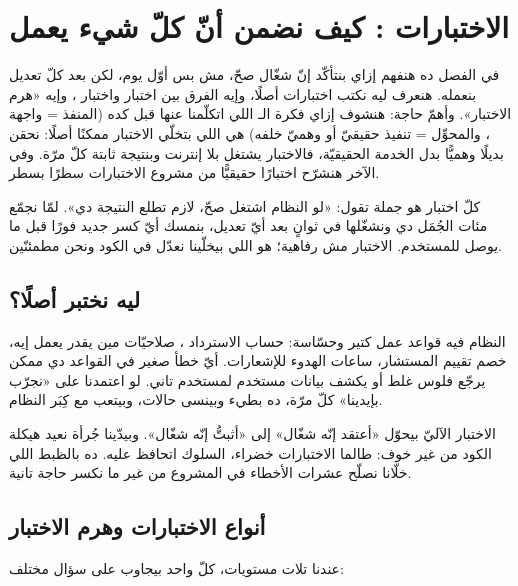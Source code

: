 \section{الاختبارات : كيف نضمن أنّ كلّ شيء يعمل}

في الفصل ده هنفهم إزاي بنتأكّد إنّ  شغّال صحّ، مش بس أوّل يوم، لكن بعد كلّ تعديل بنعمله. هنعرف ليه نكتب اختبارات أصلًا، وإيه الفرق بين اختبار  واختبار ، وإيه «هرم الاختبار». وأهمّ حاجة: هنشوف إزاي فكرة الـ  اللي اتكلّمنا عنها قبل كده (المنفذ = واجهة ، والمحوِّل = تنفيذ حقيقيّ أو وهميّ خلفه) هي اللي بتخلّي الاختبار ممكنًا أصلًا: نحقن بديلًا وهميًّا  بدل الخدمة الحقيقيّة، فالاختبار يشتغل بلا إنترنت وبنتيجة ثابتة كلّ مرّة. وفي الآخر هنشرّح اختبارًا حقيقيًّا من مشروع الاختبارات سطرًا بسطر.

\begin{idea}
كلّ اختبار هو جملة تقول: «لو النظام اشتغل صحّ، لازم تطلع النتيجة دي». لمّا نجمّع مئات الجُمَل دي ونشغّلها في ثوانٍ بعد أيّ تعديل، بنمسك أيّ كسر جديد فورًا قبل ما يوصل للمستخدم. الاختبار مش رفاهية؛ هو اللي بيخلّينا نعدّل في الكود ونحن مطمئنّين.
\end{idea}

\subsection{ليه نختبر أصلًا؟}

النظام فيه قواعد عمل كتير وحسّاسة: حساب الاسترداد ، صلاحيّات مين يقدر يعمل إيه، خصم تقييم المستشار، ساعات الهدوء للإشعارات. أيّ خطأ صغير في القواعد دي ممكن يرجّع فلوس غلط أو يكشف بيانات مستخدم لمستخدم تاني. لو اعتمدنا على «نجرّب بإيدينا» كلّ مرّة، ده بطيء وبينسى حالات، وبيتعب مع كِبَر النظام.

\begin{why}
الاختبار الآليّ بيحوّل «أعتقد إنّه شغّال» إلى «أثبتُّ إنّه شغّال». وبيدّينا جُرأة نعيد هيكلة الكود  من غير خوف: طالما الاختبارات خضراء، السلوك اتحافظ عليه. ده بالظبط اللي خلّانا نصلّح عشرات الأخطاء في المشروع من غير ما نكسر حاجة تانية.
\end{why}

\subsection{أنواع الاختبارات وهرم الاختبار}

عندنا تلات مستويات، كلّ واحد بيجاوب على سؤال مختلف:

